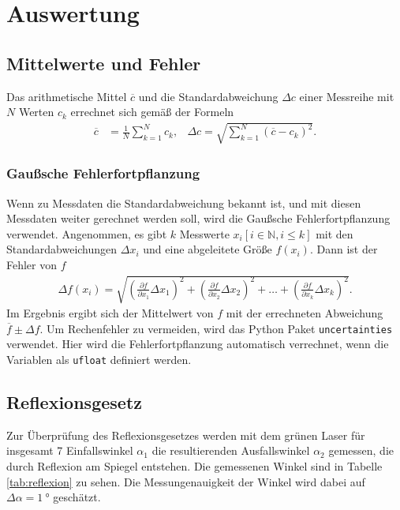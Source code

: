 \section{Auswertung}

\subsection{Mittelwerte und Fehler}
Das arithmetische Mittel $\overline{c}$ und die Standardabweichung $\Delta c$ einer Messreihe mit $N$ Werten $c_k$ errechnet sich gemäß der Formeln
\begin{align}
    \overline{c} &= \frac{1}{N} \sum_{k=1}^{N} c_k, & \Delta c = \sqrt{ \sum_{k=1}^{N} \left(\overline{c} - c_k \right)^2 }.
    \label{eq:mittelstand}
\end{align}

\subsubsection{Gaußsche Fehlerfortpflanzung}
Wenn zu Messdaten die Standardabweichung bekannt ist, und mit diesen Messdaten weiter gerechnet werden soll,
wird die Gaußsche Fehlerfortpflanzung verwendet. 
Angenommen, es gibt $k$ Messwerte $x_i [i \in \mathbb{N}, i \leq k]$ mit den Standardabweichungen $\Delta x_i$
und eine abgeleitete Größe $f(x_i)$.
Dann ist der Fehler von $f$
\begin{align}
    \Delta f(x_i) = \sqrt{
    \left(\frac{\partial f}{\partial x_1} \Delta x_1\right)^2%
     + \left(\frac{\partial f}{\partial x_2} \Delta x_2\right)^2%
     + \dots%
     + \left(\frac{\partial f}{\partial x_k} \Delta x_k\right)^2%
    }.
    \label{eq:gauss}
\end{align} 
Im Ergebnis ergibt sich der Mittelwert von $f$ mit der errechneten Abweichung $\overline{f} \pm \Delta f $.
Um Rechenfehler zu vermeiden, wird das Python \cite[]{python} Paket \texttt{uncertainties} \cite[][]{uncertainties} verwendet.
Hier wird die Fehlerfortpflanzung automatisch verrechnet, wenn die Variablen als \texttt{ufloat} definiert werden.







\subsection{Reflexionsgesetz}
\label{sec:ausw_reflexion}
Zur Überprüfung des Reflexionsgesetzes werden mit dem grünen Laser für insgesamt 7 Einfallswinkel $\alpha_1$
die resultierenden Ausfallswinkel $\alpha_2$ gemessen, die durch Reflexion am Spiegel entstehen.
Die gemessenen Winkel sind in Tabelle \ref{tab:reflexion} zu sehen.
Die Messungenauigkeit der Winkel wird dabei auf $\Delta \alpha = \qty[]{1}{\degree}$ geschätzt.

